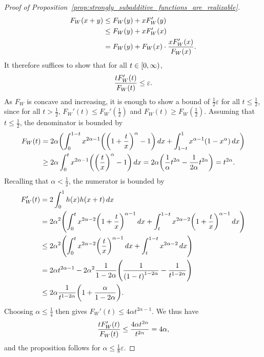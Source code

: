 \documentclass[AHL,Unicode]{cedram}
\newcommand*\eps{\varepsilon}
\newcommand*\nonnegative{\left[0,\infty\right)}
\let\originalleft\left
\let\originalright\right
\renewcommand{\left}{\mathopen{}\mathclose\bgroup\originalleft}
\renewcommand{\right}{\aftergroup\egroup\originalright}
\let\oldin\in
\renewcommand{\in}{\mathchoice{\oldin}{\oldin}{\,\oldin\,}{\,\oldin\,}}
\begin{document}
\begin{proof}[Proof of Proposition~\ref{prop:strongly_subadditive_functions_are_realizable}]
\begin{align*}
F_{W}\left(x+y\right) & \leq F_{W}\left(y\right)+xF_{W}'\left(y\right)\\
& \leq F_{W}\left(y\right)+xF_{W}'\left(x\right)\\
& =F_{W}\left(y\right)+F_{W}\left(x\right)\cdot\frac{xF_{W}'\left(x\right)}{F_{W}\left(x\right)}.
\end{align*}
It therefore suffices to show that for all $t\in\nonnegative$,
\[
\frac{tF_{W}'\left(t\right)}{F_{W}\left(t\right)}\leq\eps.
\]
As $F_{W}$ is concave and increasing, it is enough to show a bound of $\frac{1}{2}\eps$ for all $t\leq\frac{1}{2}$, since for all $t>\frac{1}{2}$, $F_{W}'(t)\leq F_{W}'(\frac{1}{2})$ and $F_{W}(t)\geq F_{W}(\frac{1}{2})$. Assuming that $t\leq\frac{1}{2}$, the denominator is bounded by
\begin{align*}
F_{W}\left(t\right) & =2\alpha\left(\int_{0}^{1-t}x^{2\alpha-1}\left(\left(1+\frac{t}{x}\right)^{\alpha}-1\right)\,dx+\int_{1-t}^{1}x^{\alpha-1}\left(1-x^{\alpha}\right)\,dx\right)\\
& \geq2\alpha\int_{0}^{t}x^{2\alpha-1}\left(\left(\frac{t}{x}\right)^{\alpha}-1\right)\,dx=2\alpha\left(\frac{1}{\alpha}t^{2\alpha}-\frac{1}{2\alpha}t^{2\alpha}\right)=t^{2\alpha}.
\end{align*}
Recalling that $\alpha<\frac{1}{2}$, the numerator is bounded by
\begin{align*}
F_{W}'\left(t\right) & =2\int_{0}^{1}h\left(x\right)h\left(x+t\right)\,dx\\
& =2\alpha^{2}\left(\int_{0}^{t}x^{2\alpha-2}\left(1+\frac{t}{x}\right)^{\alpha-1}\,dx+\int_{t}^{1-t}x^{2\alpha-2}\left(1+\frac{t}{x}\right)^{\alpha-1}\,dx\right)\\
& \leq2\alpha^{2}\left(\int_{0}^{t}x^{2\alpha-2}\left(\frac{t}{x}\right)^{\alpha-1}\,dx+\int_{t}^{1-t}x^{2\alpha-2}\,dx\right)\\
& =2\alpha t^{2\alpha-1}-2\alpha^{2}\frac{1}{1-2\alpha}\left(\frac{1}{\left(1-t\right)^{1-2\alpha}}-\frac{1}{t^{1-2\alpha}}\right)\\
& \leq2\alpha\frac{1}{t^{1-2\alpha}}\left(1+\frac{\alpha}{1-2\alpha}\right).
\end{align*}
Choosing $\alpha\leq\frac{1}{4}$ then gives $F_{W}'(t)\leq4\alpha t^{2\alpha-1}$. We thus have
\[
\frac{tF_{W}'\left(t\right)}{F_{W}\left(t\right)}\leq\frac{4\alpha t^{2\alpha}}{t^{2\alpha}}=4\alpha,
\]
and the proposition follows for $\alpha\leq\frac{1}{8}\eps$.
\end{proof}
\end{document}
